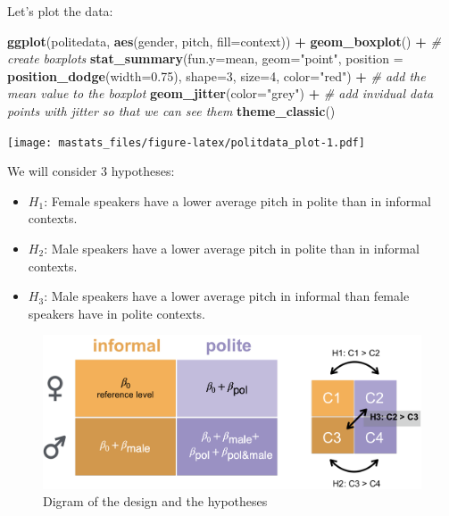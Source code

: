 \documentclass[]{book}
\newenvironment{Shaded}{\begin{snugshade}}{\end{snugshade}}
\newcommand{\CommentTok}[1]{\textcolor[rgb]{0.56,0.35,0.01}{\textit{#1}}}
\newcommand{\DataTypeTok}[1]{\textcolor[rgb]{0.13,0.29,0.53}{#1}}
\newcommand{\DecValTok}[1]{\textcolor[rgb]{0.00,0.00,0.81}{#1}}
\newcommand{\FloatTok}[1]{\textcolor[rgb]{0.00,0.00,0.81}{#1}}
\newcommand{\KeywordTok}[1]{\textcolor[rgb]{0.13,0.29,0.53}{\textbf{#1}}}
\newcommand{\NormalTok}[1]{#1}
\newcommand{\OperatorTok}[1]{\textcolor[rgb]{0.81,0.36,0.00}{\textbf{#1}}}
\newcommand{\StringTok}[1]{\textcolor[rgb]{0.31,0.60,0.02}{#1}}
\begin{document}
Let's plot the data:

\begin{Shaded}
\begin{Highlighting}[]
\KeywordTok{ggplot}\NormalTok{(politedata, }\KeywordTok{aes}\NormalTok{(gender, pitch, }\DataTypeTok{fill=}\NormalTok{context)) }\OperatorTok{+}\StringTok{ }
\StringTok{  }\KeywordTok{geom_boxplot}\NormalTok{() }\OperatorTok{+}\StringTok{ }\CommentTok{# create boxplots}
\StringTok{  }\KeywordTok{stat_summary}\NormalTok{(}\DataTypeTok{fun.y=}\NormalTok{mean, }
               \DataTypeTok{geom=}\StringTok{"point"}\NormalTok{, }
               \DataTypeTok{position =} \KeywordTok{position_dodge}\NormalTok{(}\DataTypeTok{width=}\FloatTok{0.75}\NormalTok{), }
               \DataTypeTok{shape=}\DecValTok{3}\NormalTok{, }
               \DataTypeTok{size=}\DecValTok{4}\NormalTok{, }
               \DataTypeTok{color=}\StringTok{"red"}\NormalTok{) }\OperatorTok{+}\StringTok{ }\CommentTok{# add the mean value to the boxplot}
\StringTok{  }\KeywordTok{geom_jitter}\NormalTok{(}\DataTypeTok{color=}\StringTok{"grey"}\NormalTok{) }\OperatorTok{+}\StringTok{ }\CommentTok{# add invidual data points with jitter so that we can see them}
\StringTok{  }\KeywordTok{theme_classic}\NormalTok{()}
\end{Highlighting}
\end{Shaded}

\texttt{[image: mastats\_files/figure-latex/politdata\_plot-1.pdf]}

We will consider 3 hypotheses:

\begin{itemize}
\item
  \(H_1\): Female speakers have a lower average pitch in polite than in informal contexts.
\item
  \(H_2\): Male speakers have a lower average pitch in polite than in informal contexts.
\item
  \(H_3\): Male speakers have a lower average pitch in informal than female speakers have in polite contexts.
\end{itemize}

\begin{figure}
\centering
\includegraphics{pics/table_mean_hypotheses_cropped.png}
\caption{Digram of the design and the hypotheses}
\end{figure}
\end{document}
